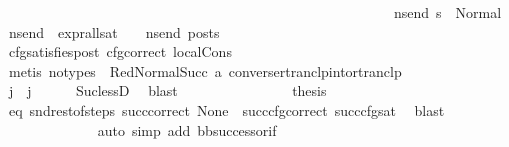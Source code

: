 \begin{isabellebody}
\ \ \ \ \ \ \ \ \ \ \ \ \ \ \ \ \ \ \ \ \ \ \ \ \ \ \ \ \ \ \ \ \ \ \ \ \ \ \ \ \ \ \ \ \ \ \ \ \ \ \ \ \ \ \ \ {\isacharparenleft}{\kern0pt}{\isasymforall}ns{\isacharunderscore}{\kern0pt}end{\isachardot}{\kern0pt}\ s{\isacharprime}{\kern0pt}\ {\isacharequal}{\kern0pt}\ Normal\ ns{\isacharunderscore}{\kern0pt}end\ {\isasymlongrightarrow}\ {\isacharparenleft}{\kern0pt}expr{\isacharunderscore}{\kern0pt}all{\isacharunderscore}{\kern0pt}sat\ {\isasymLambda}\ {\isasymGamma}\ {\isasymOmega}\ ns{\isacharunderscore}{\kern0pt}end{\isacharparenright}{\kern0pt}\ posts{\isacharparenright}{\kern0pt}{\isacharparenright}{\kern0pt}{\isacharparenright}{\kern0pt}{\isacharparenright}{\kern0pt}{\isachardoublequoteclose}\isanewline
\ \ \ \ \ \ \ \ \ \ \ \ \ \ \ \ \isamarkupfalse%
\ cfg{\isacharunderscore}{\kern0pt}satisfies{\isacharunderscore}{\kern0pt}post\ cfg{\isacharunderscore}{\kern0pt}correct\ local{\isachardot}{\kern0pt}Cons\isanewline
\ \ \ \ \ \ \ \ \ \ \ \ \ \ \ \ \isamarkupfalse%
\ {\isacharparenleft}{\kern0pt}metis\ {\isacharparenleft}{\kern0pt}no{\isacharunderscore}{\kern0pt}types{\isacharparenright}{\kern0pt}\ {\isachardoublequoteopen}{}{\isachardoublequoteclose}\ RedNormalSucc\ a{}\ converse{\isacharunderscore}{\kern0pt}rtranclp{\isacharunderscore}{\kern0pt}into{\isacharunderscore}{\kern0pt}rtranclp{\isacharparenright}{\kern0pt}\isanewline
\isanewline
\ \ \ \ \ \ \ \ \ \ \ \ \ \ \isamarkupfalse%
\ {\isachardoublequoteopen}j{\isacharprime}{\kern0pt}{\isacharprime}{\kern0pt}\ {\isacharless}{\kern0pt}\ j{\isachardoublequoteclose}\ \isamarkupfalse%
\ {}\ {}\ \isamarkupfalse%
\ Suc{\isacharunderscore}{\kern0pt}lessD\ \isamarkupfalse%
\ blast\isanewline
\isanewline
\ \ \ \ \ \ \ \ \ \ \ \ \ \ \isamarkupfalse%
\ {\isacharquery}{\kern0pt}thesis\ \isamarkupfalse%
\ eq\ snd{\isacharunderscore}{\kern0pt}rest{\isacharunderscore}{\kern0pt}of{\isacharunderscore}{\kern0pt}steps\ succ{\isacharunderscore}{\kern0pt}correct\ None\ {}\ succ{\isacharunderscore}{\kern0pt}cfg{\isacharunderscore}{\kern0pt}correct\ succ{\isacharunderscore}{\kern0pt}cfg{\isacharunderscore}{\kern0pt}sat\ \isamarkupfalse%
\ blast\isanewline
\ \ \ \ \ \ \ \ \ \ \ \ \isamarkupfalse%
\ {\isacharparenleft}{\kern0pt}auto\ simp\ add{\isacharcolon}{\kern0pt}\ bb{\isacharunderscore}{\kern0pt}successor{\isacharunderscore}{\kern0pt}if\ {}{\isacharparenright}{\kern0pt}\isanewline

\end{isabellebody}

